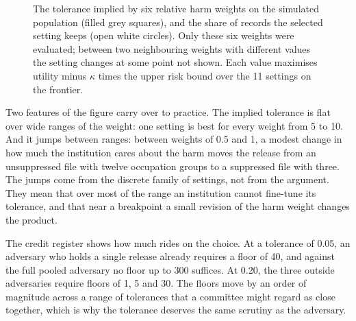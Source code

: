 \begin{figure}[ht]
\centering
{}
\caption{The tolerance implied by six relative harm weights on the simulated
population (filled grey squares), and the share of records the selected setting
keeps (open white circles). Only these six weights were evaluated; between two
neighbouring weights with different values the setting changes at some point not shown. Each value maximises utility minus
$\kappa$ times the upper risk bound over the 11 settings on the frontier.}
\label{c08:fig-implied}
\end{figure}

Two features of the figure carry over to practice. The implied tolerance is flat
over wide ranges of the weight: one setting is best for every weight from 5 to 10.
And it jumps between ranges: between weights of 0.5 and 1, a modest change in how
much the institution cares about the harm moves the release from an unsuppressed
file with twelve occupation groups to a suppressed file with three. The jumps come
from the discrete family of settings, not from the argument. They mean that over
most of the range an institution cannot fine-tune its tolerance, and that near a
breakpoint a small revision of the harm weight changes the product.

The credit register shows how much rides on the choice. At a tolerance of 0.05, an
adversary who holds a single release already requires a floor of 40, and against
the full pooled adversary no floor up to 300 suffices. At 0.20, the three outside
adversaries require floors of 1, 5 and 30.
The floors move by an order of magnitude across a range of tolerances that a
committee might regard as close together, which is why the tolerance deserves the
same scrutiny as the adversary.

